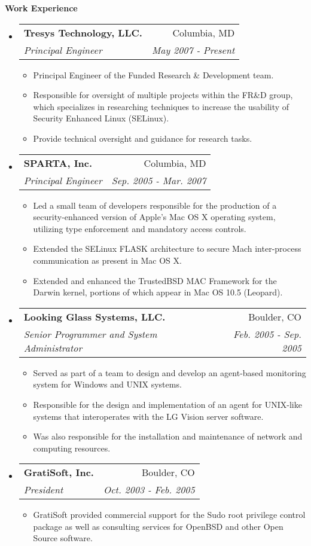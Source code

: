 \documentclass[letterpaper,11pt]{article}
\makeatletter
\newcommand{\resitem}[1]{\item #1 \vspace{-2pt}}
\newcommand{\resheading}[1]{{\large \colorbox{mygrey}{\begin{minipage}{\textwidth}{\textbf{#1 \vphantom{p\^{E}}}}\end{minipage}}}}
\newcommand{\ressubheading}[4]{
\begin{tabular*}{6.5in}{l@{\extracolsep{\fill}}r}
		\textbf{#1} & #2 \\
		\textit{#3} & \textit{#4} \\
\end{tabular*}\vspace{-6pt}}
\makeatother
\begin{document}
\resheading{Work Experience}
\begin{itemize}
\item
	\ressubheading{Tresys Technology, LLC.}{Columbia, MD}{Principal Engineer}{May 2007 - Present}
	\begin{itemize}
		\resitem{Principal Engineer of the Funded Research \& Development team.}
		\resitem{Responsible for oversight of multiple projects within the FR\&D group, which specializes in researching techniques to increase the usability of Security Enhanced Linux (SELinux).}
		\resitem{Provide technical oversight and guidance for research tasks.}
	\end{itemize}

\item
	\ressubheading{SPARTA, Inc.}{Columbia, MD}{Principal Engineer}{Sep. 2005 - Mar. 2007}
	\begin{itemize}
		\resitem{Led a small team of developers responsible for the production of a security-enhanced version of Apple's Mac OS X operating system, utilizing type enforcement and mandatory access controls.}
		\resitem{Extended the SELinux FLASK architecture to secure Mach inter-process communication as present in Mac OS X.}
		\resitem{Extended and enhanced the TrustedBSD MAC Framework for the Darwin kernel, portions of which appear in Mac OS 10.5 (Leopard).}
	\end{itemize}

\item 
	\ressubheading{Looking Glass Systems, LLC.}{Boulder, CO}{Senior Programmer and System Administrator}{Feb. 2005 - Sep. 2005}
	\begin{itemize}
		\resitem{Served as part of a team to design and develop an agent-based monitoring system for Windows and {\sc UNIX} systems.}
		\resitem{Responsible for the design and implementation of an agent for UNIX-like systems that interoperates with the LG Vision server software.}
		\resitem{Was also responsible for the installation and maintenance of network and computing resources.}
	\end{itemize}

\item
	\ressubheading{GratiSoft, Inc.}{Boulder, CO}{President}{Oct. 2003 - Feb. 2005}
	\begin{itemize}
		\resitem{GratiSoft provided commercial support for the Sudo root privilege control package as well as consulting services for OpenBSD and other Open Source software.}
	\end{itemize}


\end{itemize}
\end{document}
